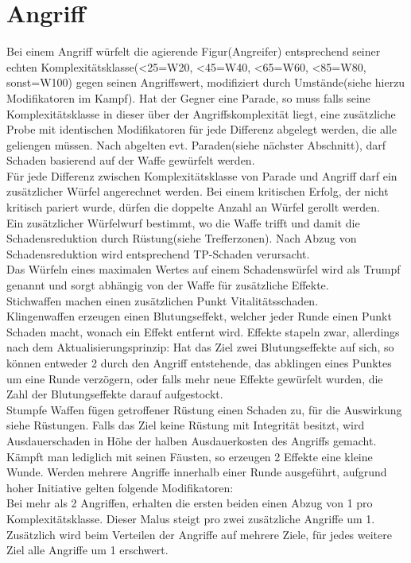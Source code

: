 \documentclass[a4paper,12pt,oneside]{book}
\begin{document}
\section{Angriff}
Bei einem Angriff würfelt die agierende Figur(Angreifer) entsprechend seiner echten Komplexitätsklasse(\textless25=W20, \textless45=W40, \textless65=W60, \textless85=W80, sonst=W100) gegen seinen Angriffswert, modifiziert durch Umstände(siehe hierzu Modifikatoren im Kampf). Hat der Gegner eine Parade, so muss falls seine Komplexitätsklasse in dieser über der Angriffskomplexität liegt, eine zusätzliche Probe mit identischen Modifikatoren für jede Differenz abgelegt werden, die alle geliengen müssen.
Nach abgelten evt. Paraden(siehe nächster Abschnitt), darf Schaden basierend auf der Waffe gewürfelt werden.
\\Für jede Differenz zwischen Komplexitätsklasse von Parade und Angriff darf ein zusätzlicher Würfel angerechnet werden. Bei einem kritischen Erfolg, der nicht kritisch pariert wurde, dürfen die doppelte Anzahl an Würfel gerollt werden.
\\Ein zusätzlicher Würfelwurf bestimmt, wo die Waffe trifft und damit die Schadensreduktion durch Rüstung(siehe Trefferzonen). Nach Abzug von Schadensreduktion wird  entsprechend TP-Schaden verursacht.
\\Das Würfeln eines maximalen Wertes auf einem Schadenswürfel wird als Trumpf genannt und sorgt abhängig von der Waffe für zusätzliche Effekte.
\\Stichwaffen machen einen zusätzlichen Punkt Vitalitätsschaden.
\\Klingenwaffen erzeugen einen Blutungseffekt, welcher jeder Runde einen Punkt Schaden macht, wonach ein Effekt entfernt wird. Effekte stapeln zwar, allerdings nach dem Aktualisierungsprinzip: Hat das Ziel zwei Blutungseffekte auf sich, so können entweder 2 durch den Angriff entstehende, das abklingen eines Punktes um eine Runde verzögern, oder falls mehr neue Effekte gewürfelt wurden, die Zahl der Blutungseffekte darauf aufgestockt.
\\Stumpfe Waffen fügen getroffener Rüstung einen Schaden zu, für die Auswirkung siehe Rüstungen. Falls das Ziel keine Rüstung mit Integrität besitzt, wird Ausdauerschaden in Höhe der halben Ausdauerkosten des Angriffs gemacht.
\\Kämpft man lediglich mit seinen Fäusten, so erzeugen 2 Effekte eine kleine Wunde.
Werden mehrere Angriffe innerhalb einer Runde ausgeführt, aufgrund hoher Initiative gelten folgende Modifikatoren:
\\Bei mehr als 2 Angriffen, erhalten die ersten beiden einen Abzug von 1 pro Komplexitätsklasse. Dieser Malus steigt pro zwei zusätzliche Angriffe um 1. Zusätzlich wird beim Verteilen der Angriffe auf mehrere Ziele, für jedes weitere Ziel alle Angriffe um 1 erschwert.
\end{document}
